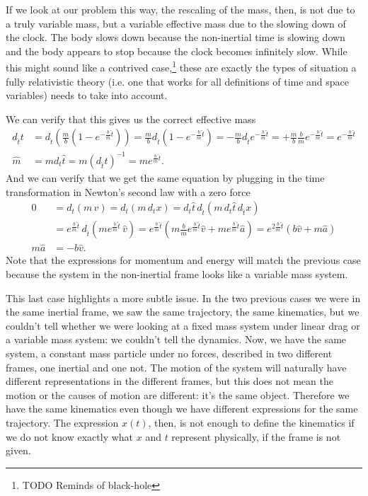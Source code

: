If we look at our problem this way, the rescaling of the mass, then, is not due to a truly variable mass, but a variable effective mass due to the slowing down of the clock. The body slows down because the non-inertial time is slowing down and the body appears to stop because the clock becomes infinitely slow. While this might sound like a contrived case,\footnote{TODO Reminds of black-hole} these are exactly the types of situation a fully relativistic theory (i.e. one that works for all definitions of time and space variables) needs to take into account.

We can verify that this gives us the correct effective mass
\begin{equation}
	\begin{aligned}
	d_{\hat{t}} t  &=d_{\hat{t}} \left( \frac{m}{b} (1-e^{-\frac{b}{m}\hat{t}}) \right) =\frac{m}{b} d_{\hat{t}} (1-e^{-\frac{b}{m}\hat{t}}) = - \frac{m}{b} d_{\hat{t}} e^{-\frac{b}{m}\hat{t}} = + \frac{m}{b} \frac{b}{m} e^{-\frac{b}{m}\hat{t}} = e^{-\frac{b}{m}\hat{t}} \\
	\hat{m} &= m d_t \hat{t} = m (d_{\hat{t}} t)^{-1} = m e^{\frac{b}{m}\hat{t}}.
	\end{aligned}
\end{equation}
And we can verify that we get the same equation by plugging in the time transformation in Newton's second law with a zero force
\begin{equation}
	\begin{aligned}
		0 &= d_t  (m \, v) = d_t  (m \, d_t x) = d_t \hat{t} \, d_{\hat{t}}  (m \, d_t \hat{t} \, d_{\hat{t}} x) \\ &= e^{\frac{b}{m}\hat{t}} \, d_{\hat{t}}  (m e^{\frac{b}{m}\hat{t}} \, \hat{v}) = e^{\frac{b}{m}\hat{t}} \left( m \frac{b}{m} e^{\frac{b}{m}\hat{t}} \hat{v} + m e^{\frac{b}{m}\hat{t}} \hat{a} \right)  = e^{2\frac{b}{m}\hat{t}} \left( b \hat{v} + m \hat{a} \right) \\
		m \hat{a} &= - b \hat{v}.
	\end{aligned}
\end{equation}
Note that the expressions for momentum and energy will match the previous case because the system in the non-inertial frame looks like a variable mass system.

This last case highlights a more subtle issue. In the two previous cases we were in the same inertial frame, we saw the same trajectory, the same kinematics, but we couldn't tell whether we were looking at a fixed mass system under linear drag or a variable mass system: we couldn't tell the dynamics. Now, we have the same system, a constant mass particle under no forces, described in two different frames, one inertial and one not. The motion of the system will naturally have different representations in the different frames, but this does not mean the motion or the causes of motion are different: it's the same object. Therefore we have the same kinematics even though we have different expressions for the same trajectory. The expression $x(t)$, then, is not enough to define the kinematics if we do not know exactly what $x$ and $t$ represent physically, if the frame is not given.


